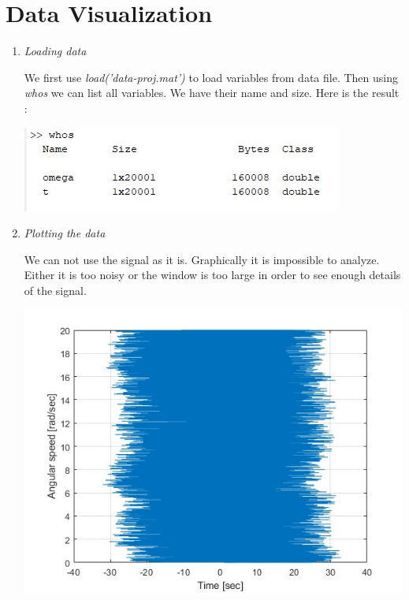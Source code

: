 \documentclass[a4paper,12pt]{article}
\begin{document}
\section{Data Visualization}
\begin{enumerate}[label={\color{blue}\arabic*)}]

\item \emph{Loading data}

We first use \textit{load('data-proj.mat')} to load variables from data file. Then using \textit{whos} we can list all variables. We have their name and size.
Here is the result : 
\begin{center}
  \includegraphics[scale=1]{images/q1.JPG}
\end{center}

\item \emph{Plotting the data}

We can not use the signal as it is. Graphically it is impossible to analyze. Either it is too noisy or the window is too large in order to see enough details of the signal.
\begin{center}
  \includegraphics[scale=0.5]{Figures/q2.jpg}
\end{center}

\end{enumerate}
\end{document}
